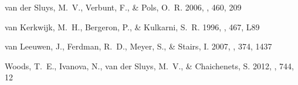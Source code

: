 \documentclass[apjl]{emulateapj}
\begin{document}
\begin{thebibliography}{35}
{van der Sluys}, M.~V., {Verbunt}, F., \& {Pols}, O.~R. 2006, \aap, 460, 209

{van Kerkwijk}, M.~H., {Bergeron}, P., \& {Kulkarni}, S.~R. 1996, \apjl, 467,
  L89

{van Leeuwen}, J., {Ferdman}, R.~D., {Meyer}, S., \& {Stairs}, I. 2007, \mnras,
  374, 1437

{Woods}, T.~E., {Ivanova}, N., {van der Sluys}, M.~V., \& {Chaichenets}, S.
  2012, \apj, 744, 12

%
  


\end{thebibliography}
\end{document}
